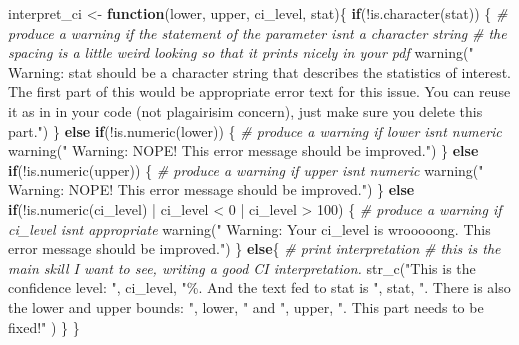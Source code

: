 \documentclass[
  openany]{book}
\newenvironment{Shaded}{\begin{snugshade}}{\end{snugshade}}
\newcommand{\CommentTok}[1]{\textcolor[rgb]{0.56,0.35,0.01}{\textit{#1}}}
\newcommand{\ControlFlowTok}[1]{\textcolor[rgb]{0.13,0.29,0.53}{\textbf{#1}}}
\newcommand{\DecValTok}[1]{\textcolor[rgb]{0.00,0.00,0.81}{#1}}
\newcommand{\FunctionTok}[1]{\textcolor[rgb]{0.00,0.00,0.00}{#1}}
\newcommand{\NormalTok}[1]{#1}
\newcommand{\OtherTok}[1]{\textcolor[rgb]{0.56,0.35,0.01}{#1}}
\newcommand{\SpecialCharTok}[1]{\textcolor[rgb]{0.00,0.00,0.00}{#1}}
\newcommand{\StringTok}[1]{\textcolor[rgb]{0.31,0.60,0.02}{#1}}
\begin{document}
\begin{Shaded}
\begin{Highlighting}[]
\NormalTok{interpret\_ci }\OtherTok{\textless{}{-}} \ControlFlowTok{function}\NormalTok{(lower, upper, ci\_level, stat)\{}
  \ControlFlowTok{if}\NormalTok{(}\SpecialCharTok{!}\FunctionTok{is.character}\NormalTok{(stat)) \{}
    \CommentTok{\# produce a warning if the statement of the parameter isn\textquotesingle{}t a character string}
    \CommentTok{\# the spacing is a little weird looking so that it prints nicely in your pdf}
    \FunctionTok{warning}\NormalTok{(}\StringTok{"}
\StringTok{    Warning:}
\StringTok{    stat should be a character string that describes the statistics of }
\StringTok{    interest. The first part of this would be appropriate error text for this }
\StringTok{    issue. You can reuse it as in in your code (not plagairisim concern), }
\StringTok{    just make sure you delete this part."}\NormalTok{)}
\NormalTok{  \} }\ControlFlowTok{else} \ControlFlowTok{if}\NormalTok{(}\SpecialCharTok{!}\FunctionTok{is.numeric}\NormalTok{(lower)) \{}
    \CommentTok{\# produce a warning if lower isn\textquotesingle{}t numeric}
    \FunctionTok{warning}\NormalTok{(}\StringTok{"}
\StringTok{            Warning: NOPE! This error message should be improved."}\NormalTok{)}
\NormalTok{  \} }\ControlFlowTok{else} \ControlFlowTok{if}\NormalTok{(}\SpecialCharTok{!}\FunctionTok{is.numeric}\NormalTok{(upper)) \{}
    \CommentTok{\# produce a warning if upper isn\textquotesingle{}t numeric}
    \FunctionTok{warning}\NormalTok{(}\StringTok{"}
\StringTok{            Warning: NOPE! This error message should be improved."}\NormalTok{)}
\NormalTok{  \} }\ControlFlowTok{else} \ControlFlowTok{if}\NormalTok{(}\SpecialCharTok{!}\FunctionTok{is.numeric}\NormalTok{(ci\_level) }\SpecialCharTok{|}\NormalTok{ ci\_level }\SpecialCharTok{\textless{}} \DecValTok{0} \SpecialCharTok{|}\NormalTok{ ci\_level }\SpecialCharTok{\textgreater{}} \DecValTok{100}\NormalTok{) \{}
    \CommentTok{\# produce a warning if ci\_level isn\textquotesingle{}t appropriate}
    \FunctionTok{warning}\NormalTok{(}\StringTok{"}
\StringTok{    Warning: Your ci\_level is wrooooong. }
\StringTok{    This error message should be improved."}\NormalTok{)}
\NormalTok{  \} }\ControlFlowTok{else}\NormalTok{\{}
    \CommentTok{\# print interpretation}
    \CommentTok{\# this is the main skill I want to see, writing a good CI interpretation.}
  \FunctionTok{str\_c}\NormalTok{(}\StringTok{"This is the confidence level: "}\NormalTok{, ci\_level, }
        \StringTok{"\%. And the text fed to stat is "}\NormalTok{, stat, }
        \StringTok{". There is also the lower and upper bounds: "}\NormalTok{, lower, }\StringTok{" and "}\NormalTok{, upper, }
        \StringTok{". This part needs to be fixed!"}\NormalTok{ )}
\NormalTok{  \}}
\NormalTok{\}}


\end{Highlighting}
\end{Shaded}
\end{document}
